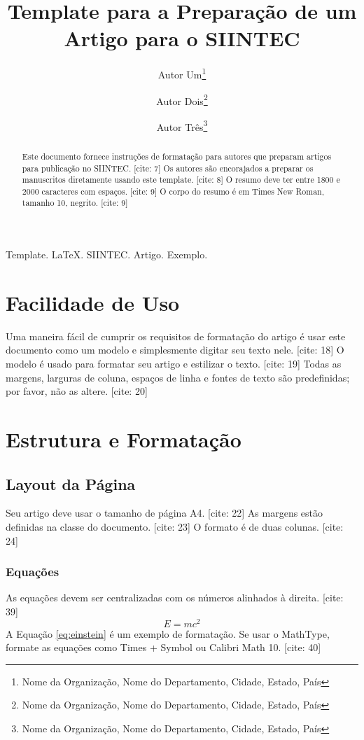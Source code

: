 \documentclass{siintec}
\title{Template para a Preparação de um Artigo para o SIINTEC} %
\author{
  Autor Um\thanks{Nome da Organização, Nome do Departamento, Cidade, Estado, País} \and
  Autor Dois\thanks{Nome da Organização, Nome do Departamento, Cidade, Estado, País} \and
  Autor Três\thanks{Nome da Organização, Nome do Departamento, Cidade, Estado, País}
}
\begin{document}
\maketitle

\begin{abstract}
Este documento fornece instruções de formatação para autores que preparam artigos para publicação no SIINTEC. [cite: 7] Os autores são encorajados a preparar os manuscritos diretamente usando este template. [cite: 8] O resumo deve ter entre 1800 e 2000 caracteres com espaços. [cite: 9] O corpo do resumo é em Times New Roman, tamanho 10, negrito. [cite: 9]
\end{abstract}

\begin{keywords}
Template. LaTeX. SIINTEC. Artigo. Exemplo. %
\end{keywords}


\doublespacing

\section{Facilidade de Uso}
Uma maneira fácil de cumprir os requisitos de formatação do artigo é usar este documento como um modelo e simplesmente digitar seu texto nele. [cite: 18] O modelo é usado para formatar seu artigo e estilizar o texto. [cite: 19] Todas as margens, larguras de coluna, espaços de linha e fontes de texto são predefinidas; por favor, não as altere. [cite: 20]

\lipsum[1] %

\section{Estrutura e Formatação}

\subsection{Layout da Página}
Seu artigo deve usar o tamanho de página A4. [cite: 22] As margens estão definidas na classe do documento. [cite: 23] O formato é de duas colunas. [cite: 24]
\lipsum[2]

\subsubsection{Equações}
As equações devem ser centralizadas com os números alinhados à direita. [cite: 39]
\begin{equation}
E = mc^2 \label{eq:einstein}
\end{equation}
A Equação \ref{eq:einstein} é um exemplo de formatação. Se usar o MathType, formate as equações como Times + Symbol ou Calibri Math 10. [cite: 40]
\end{document}
